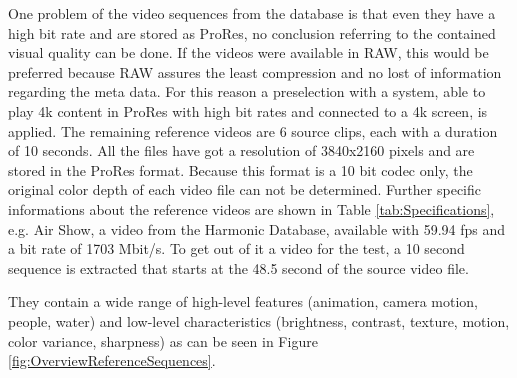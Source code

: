 One problem of the video sequences from the database is that even they have a high bit rate and are stored as ProRes, no conclusion referring to the contained visual quality can be done. If the videos were available in RAW, this would be preferred because RAW assures the least compression and no lost of information regarding the meta data.
For this reason a preselection with a system, able to play 4k content in ProRes with high bit rates and connected to a 4k screen, is applied.
The remaining reference videos are 6 source clips, each with a duration of 10 seconds. All the files have got a resolution of 3840x2160 pixels and are stored in the ProRes format. Because this format is a 10 bit codec only, the original color depth of each video file can not be determined.
Further specific informations about the reference videos are shown in Table \ref{tab:Specifications}, e.g. Air Show, a video from the Harmonic Database, available with 59.94 fps and a bit rate of 1703 Mbit/s. To get out of it a video for the test, a 10 second sequence is extracted that starts at the 48.5 second of the source video file.

They contain a wide range of high-level features (animation, camera motion, people, water) and low-level characteristics (brightness, contrast, texture, motion, color variance, sharpness) as can be seen in Figure \ref{fig:OverviewReferenceSequences}.

